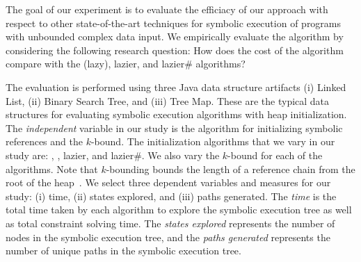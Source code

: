 
\begin{comment}
Loops and recursive methods over symbolic variables are bounded based
on some user-provided limit. These bounds are based on some
control-flow structure of the program and are often insufficient for
analyzing programs with input of complex data types as demonstrated
in~\cite{Kiasan07,Kiasan06}. In this work we use the $k$-bounding
technique that bounds the length of a reference chain from the root of
the heap~\cite{Deng:2006}.\nsr{check this!} Note we use $k$-bounding
because it preserves the functional equivalence of \gsetxt{}, lazier,
lazier\# and \symtxt{} techniques, a fact which can be established by
induction over the length of reference chains from a given initial
state. The $n$-bounding approach restricts the total number of
references created along a certain path. There is no easy way to
compare the number of references generated by \symtxt{} and other
techniques since \symtxt{} can create many references at a single
access point in its heap summary.
\end{comment}

The goal of our experiment is to evaluate the efficiacy of our
approach with respect to other state-of-the-art techniques for
symbolic execution of programs with unbounded complex data input. We
empirically evaluate the \symtxt{} algorithm by considering the
following research question: How does the cost of the \symtxt{}
algorithm compare with the \gsetxt{} (lazy), lazier, and lazier\#
algorithms?


The evaluation is performed using three Java data structure artifacts
(i) Linked List, (ii) Binary Search Tree, and (iii) Tree Map.  These
are the typical data structures for evaluating symbolic execution
algorithms with heap initialization. The \emph{independent} variable
in our study is the algorithm for initializing symbolic references and
the $k$-bound. The initialization algorithms that we vary in our study
are: \symtxt{}, \gsetxt{}, lazier, and lazier\#. We also vary the
$k$-bound for each of the algorithms. Note that $k$-bounding bounds
the length of a reference chain from the root of the
heap~\cite{Kiasan06}.  We select three dependent variables and
measures for our study: (i) time, (ii) states explored, and (iii)
paths generated. The \emph{time} is the total time taken by each
algorithm to explore the symbolic execution tree as well as total
constraint solving time. The \emph{states explored} represents the
number of nodes in the symbolic execution tree, and the \emph{paths
  generated} represents the number of unique paths in the symbolic
execution tree.


